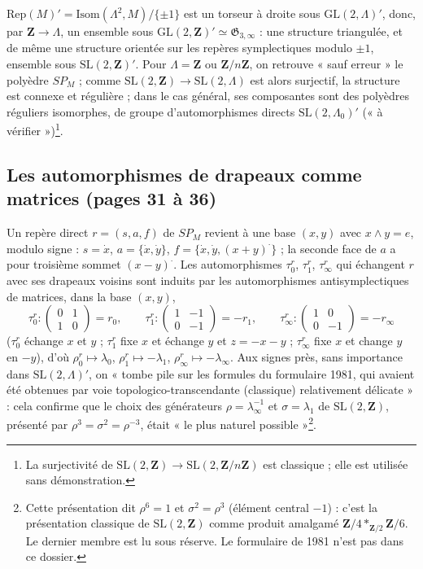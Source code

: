 \documentclass[11pt,a4paper]{article}
\begin{document}
$\mathrm{Rep}(M)' = \mathrm{Isom}(\Lambda^2, M)/\{\pm 1\}$ est un torseur à
droite sous $\mathrm{GL}(2, \Lambda)'$, donc, par $\mathbf{Z} \to \Lambda$, un
ensemble sous $\mathrm{GL}(2, \mathbf{Z})' \simeq \mathfrak{G}_{3,\infty}$ :
une structure triangulée, et de même une structure orientée sur les repères
symplectiques modulo $\pm 1$, ensemble sous $\mathrm{SL}(2, \mathbf{Z})'$. Pour
$\Lambda = \mathbf{Z}$ ou $\mathbf{Z}/n\mathbf{Z}$, on retrouve « sauf erreur »
le polyèdre $SP_M$ ; comme $\mathrm{SL}(2, \mathbf{Z}) \to \mathrm{SL}(2,
\Lambda)$ est alors surjectif, la structure est connexe et régulière ; dans le
cas général, ses composantes sont des polyèdres réguliers isomorphes, de
groupe d'automorphismes directs $\mathrm{SL}(2, \Lambda_0)'$ (« à
vérifier »)\footnote{La surjectivité de $\mathrm{SL}(2, \mathbf{Z}) \to
\mathrm{SL}(2, \mathbf{Z}/n\mathbf{Z})$ est classique ; elle est utilisée sans
démonstration.}.

\subsection*{Les automorphismes de drapeaux comme matrices (pages 31 à 36)}

Un repère direct $r = (s, a, f)$ de $SP_M$ revient à une base $(x, y)$ avec $x
\wedge y = e$, modulo signe : $s = \dot x$, $a = \{\dot x, \dot y\}$, $f =
\{\dot x, \dot y, (x+y)^{\cdot}\}$ ; la seconde face de $a$ a pour troisième
sommet $(x - y)^{\cdot}$. Les automorphismes $\tau_0^r$, $\tau_1^r$,
$\tau_\infty^r$ qui échangent $r$ avec ses drapeaux voisins sont induits par
les automorphismes antisymplectiques de matrices, dans la base $(x, y)$,
\[
  \tau_0^r : \begin{pmatrix} 0 & 1 \\ 1 & 0 \end{pmatrix} = r_0, \qquad
  \tau_1^r : \begin{pmatrix} 1 & -1 \\ 0 & -1 \end{pmatrix} = -r_1, \qquad
  \tau_\infty^r : \begin{pmatrix} 1 & 0 \\ 0 & -1 \end{pmatrix} = -r_\infty
\]
($\tau_0^r$ échange $x$ et $y$ ; $\tau_1^r$ fixe $x$ et échange $y$ et $z =
-x-y$ ; $\tau_\infty^r$ fixe $x$ et change $y$ en $-y$), d'où $\rho_0^r \mapsto
\lambda_0$, $\rho_1^r \mapsto -\lambda_1$, $\rho_\infty^r \mapsto
-\lambda_\infty$. Aux signes près, sans importance dans $\mathrm{SL}(2,
\Lambda)'$, on « tombe pile sur les formules du formulaire 1981, qui avaient
été obtenues par voie topologico-transcendante (classique) relativement
délicate » : cela confirme que le choix des générateurs $\rho =
\lambda_\infty^{-1}$ et $\sigma = \lambda_1$ de $\mathrm{SL}(2, \mathbf{Z})$,
présenté par $\rho^3 = \sigma^2 = \rho^{-3}$, était « le plus naturel
possible »\footnote{Cette présentation dit $\rho^6 = 1$ et $\sigma^2 = \rho^3$
(élément central $-1$) : c'est la présentation classique de $\mathrm{SL}(2,
\mathbf{Z})$ comme produit amalgamé $\mathbf{Z}/4 *_{\mathbf{Z}/2}
\mathbf{Z}/6$. Le dernier membre est lu sous réserve. Le formulaire de 1981
n'est pas dans ce dossier.}.
\end{document}
